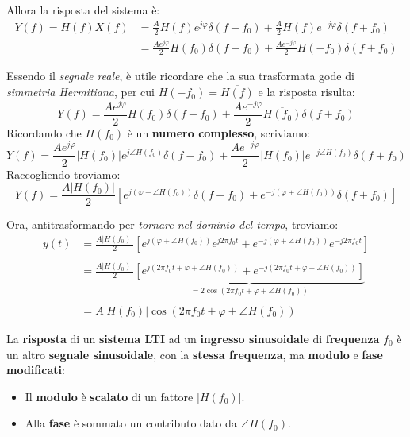 Allora la risposta del sistema è:
\[
    \begin{aligned}
        Y(f) = H(f)X(f) &= \frac{A}{2} H(f) e^{j \varphi } \delta(f-f_{0}) + 
                \frac{A}{2} H(f) e^{-j \varphi } \delta(f+f_{0}) \\ 
             &= \frac{Ae^{j \varphi }}{2} H(f_{0})\delta(f-f_{0}) +
                \frac{Ae^{-j \varphi }}{2} H(-f_{0})\delta(f+f_{0})
    \end{aligned}
\]

Essendo il \textit{segnale reale}, è utile ricordare che la sua trasformata gode di
\textit{simmetria Hermitiana}, per cui $H(-f_{0})=\overline{H(f)}$ e la risposta risulta:
\[
   Y(f) = \frac{Ae^{j \varphi }}{2} H(f_{0})\delta(f-f_{0}) +
          \frac{Ae^{-j \varphi }}{2} \overline{H(f_{0})}\delta(f+f_{0}) 
\]
Ricordando che $H(f_{0})$ è un \textbf{numero complesso}, scriviamo:
\[
    Y(f) = \frac{Ae^{j \varphi }}{2} |H(f_{0})|e^{j\angle H(f_{0})} \delta(f-f_{0}) +
          \frac{Ae^{-j \varphi }}{2} |H(f_{0})|e^{-j\angle H(f_{0})} \delta(f+f_{0}) 
\]
Raccogliendo troviamo:
\[
    Y(f) = \frac{A|H(f_{0})|}{2} \left[ e^{j(\varphi + \angle H(f_0)) } \delta(f-f_{0}) +  
           e^{-j (\varphi + \angle H(f_0)) } \delta(f+f_{0}) \right]
\]

Ora, antitrasformando per \textit{tornare nel dominio del tempo}, troviamo:
\[
    \begin{aligned}
        y(t) &= \frac{A|H(f_{0})|}{2} \left[ e^{j(\varphi + \angle H(f_0))} e^{j 2\pi f_{0}t} +
                e^{-j(\varphi + \angle H(f_0))} e^{-j 2\pi f_{0}t} \right] \\ \\
             &= \frac{A|H(f_{0})|}{2} \underbrace{ \left[ e^{j(2\pi f_{0}t + \varphi + \angle H(f_0))} +
             e^{-j(2\pi f_{0}t + \varphi + \angle H(f_0))} \right] }_{=2\cos 
                (2\pi f_{0}t + \varphi + \angle H(f_0) )} \\ \\
             &= A|H(f_{0})| \cos (2\pi f_{0}t + \varphi + \angle H(f_0) )
    \end{aligned}
\]

\begin{remark}
    La \textbf{risposta} di un \textbf{sistema LTI} ad un \textbf{ingresso sinusoidale}
    di \textbf{frequenza} $f_{0}$ è un altro \textbf{segnale sinusoidale}, con 
    la \textbf{stessa frequenza}, ma \textbf{modulo} e \textbf{fase modificati}:
    \begin{itemize}
        \item Il \textbf{modulo} è \textbf{scalato} di un fattore $|H(f_{0})|$.
        \item Alla \textbf{fase} è  sommato un contributo dato da $\angle H(f_{0})$.
    \end{itemize}
\end{remark}

